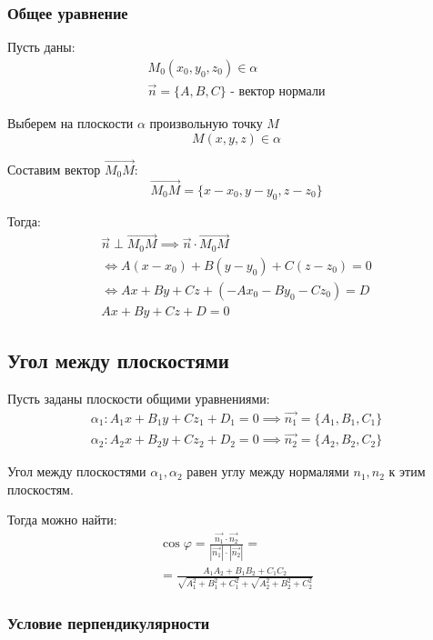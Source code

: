 \subsubsection{Общее уравнение}

Пусть даны:
\begin{gather*}
  M_0(x_0, y_0, z_0) \in \alpha \\
  \vec{n} = \{A,B, C\} \text{ - вектор нормали} 
\end{gather*}

Выберем на плоскости $\alpha$ произвольную точку $M$  \[
M(x, y, z) \in \alpha
\] 

Составим вектор $\overrightarrow{M_0 M}$: \[
\overrightarrow{M_0 M} = \{x - x_0, y - y_0, z - z_0\} 
\] 

Тогда:
\begin{gather*}
  \vec{n} \perp \overrightarrow{M_0 M} \implies \vec{n} \cdot \overrightarrow{M_0M} \\
  \iff A(x - x_0) + B(y - y_0) + C(z - z_0) = 0 \\
  \iff Ax + By + Cz + (-Ax_0 - By_0 - Cz_0) = D \\
  \boxed{Ax + By + Cz + D = 0}
\end{gather*}

\subsection{Угол между плоскостями}

Пусть заданы плоскости общими уравнениями:
\begin{gather*}
  \alpha_1: A_1x + B_1y + Cz_1 + D_1 = 0 \implies \vec{n_1} = \{A_1, B_1, C_1\}  \\
  \alpha_2: A_2x + B_2y + Cz_2 + D_2 = 0 \implies \vec{n_2} = \{A_2, B_2, C_2\} 
\end{gather*}

Угол между плоскостями $\alpha_1, \alpha_2$ равен углу между нормалями $n_1, n_2$ к этим плоскостям.

Тогда можно найти:
\begin{gather*}
  \cos \varphi = \frac{\vec{n_1} \cdot \vec{n_2}}{|\vec{n_1}| \cdot |\vec{n_2}|} = \\
  = \boxed{\frac{A_1 A_2 + B_1 B_2 + C_1 C_2}{\sqrt{A_1^2 + B_1^2 + C_1^2} + \sqrt{A_2^2 + B_2^2 + C_2^2}}}
\end{gather*}

\subsubsection{Условие перпендикулярности}

